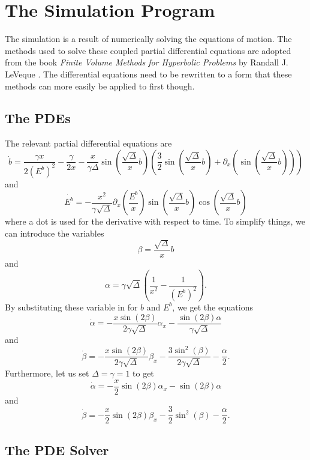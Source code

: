 \documentclass[12pt]{article}
\begin{document}
\section{The Simulation Program}

The simulation is a result of numerically solving the equations of motion. The methods
used to solve these coupled partial differential equations are adopted from the book
\textit{Finite Volume Methods for Hyperbolic Problems} by Randall J. LeVeque \cite{fvm}.
The differential equations need to be rewritten to a form that these methods can more
easily be applied to first though.

\subsection{The PDEs}

The relevant partial differential equations are
\[ \dot{b} = \frac{\gamma x}{2(E^b)^2} - \frac{\gamma}{2x} - \frac{x}{\gamma\Delta}
\sin\left( \frac{\sqrt{\Delta}}{x}b \right) \left( \frac{3}{2}\sin\left(
\frac{\sqrt{\Delta}}{x}b \right) + \partial_x \left(
\sin\left(\frac{\sqrt{\Delta}}{x}b\right) \right) \right) \]
and
\[ \dot{E^b} = -\frac{x^2}{\gamma\sqrt{\Delta}} \partial_x \left( \frac{E^b}{x} \right)
\sin \left( \frac{\sqrt{\Delta}}{x}b \right) \cos \left( \frac{\sqrt{\Delta}}{x}b
\right) \]
where a dot is used for the derivative with respect to time. To simplify things, we can
introduce the variables
\[ \beta = \frac{\sqrt{\Delta}}{x}b \]
and
\[ \alpha = \gamma\sqrt{\Delta} \left( \frac{1}{x^2} - \frac{1}{(E^b)^2} \right). \]
By substituting these variable in for $b$ and $E^b$, we get the equations
\[ \dot{\alpha} = -\frac{x\sin(2\beta)}{2\gamma\sqrt{\Delta}}\alpha_x -
\frac{\sin(2\beta)\alpha}{\gamma\sqrt{\Delta}} \]
and
\[ \dot{\beta} = -\frac{x\sin(2\beta)}{2\gamma\sqrt{\Delta}}\beta_x -
\frac{3\sin^2(\beta)}{2\gamma\sqrt{\Delta}} - \frac{\alpha}{2}. \]
Furthermore, let us set $\Delta = \gamma = 1$ to get
\begin{equation} \label{eq:a}
    \dot{\alpha} = -\frac{x}{2}\sin(2\beta)\alpha_x - \sin(2\beta)\alpha
\end{equation}
and
\begin{equation} \label{eq:b}
    \dot{\beta} = -\frac{x}{2}\sin(2\beta)\beta_x - \frac{3}{2}\sin^2(\beta) -
    \frac{\alpha}{2}.
\end{equation}

\subsection{The PDE Solver}
\end{document}
